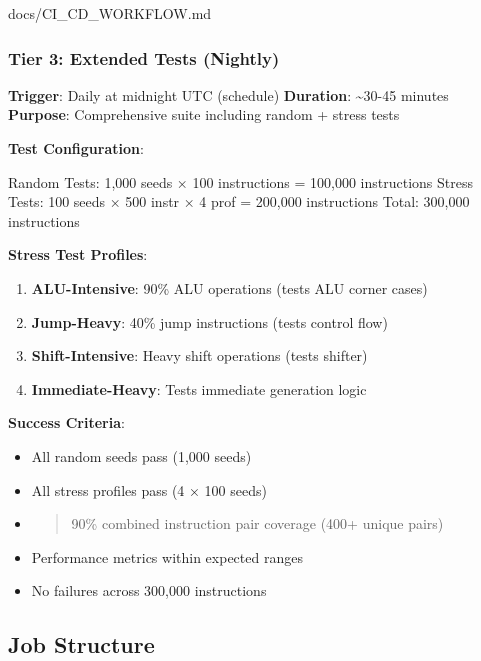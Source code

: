 \begin{relocated}{docs/CI_CD_WORKFLOW.md}
\subsubsection{Tier 3: Extended Tests (Nightly)}\label{um:flow:ci-cd-workflow:tier-3-extended-tests-nightly}

\textbf{Trigger}: Daily at midnight UTC (schedule) \textbf{Duration}:
\textasciitilde30-45 minutes \textbf{Purpose}: Comprehensive suite
including random + stress tests

\textbf{Test Configuration}:

\begin{textblock}
Random Tests:  1,000 seeds × 100 instructions = 100,000 instructions
Stress Tests:  100 seeds × 500 instr × 4 prof = 200,000 instructions
Total:                                          300,000 instructions
\end{textblock}

\textbf{Stress Test Profiles}:

\begin{enumerate}
\def\labelenumi{\arabic{enumi}.}
\tightlist
\item
  \textbf{ALU-Intensive}: 90\% ALU operations (tests ALU corner cases)
\item
  \textbf{Jump-Heavy}: 40\% jump instructions (tests control flow)
\item
  \textbf{Shift-Intensive}: Heavy shift operations (tests shifter)
\item
  \textbf{Immediate-Heavy}: Tests immediate generation logic
\end{enumerate}

\textbf{Success Criteria}:

\begin{itemize}
\item
  All random seeds pass (1,000 seeds)
\item
  All stress profiles pass (4 × 100 seeds)
\item
  \begin{quote}
  90\% combined instruction pair coverage (400+ unique pairs)
  \end{quote}
\item
  Performance metrics within expected ranges
\item
  No failures across 300,000 instructions
\end{itemize}

\subsection{Job Structure}\label{um:flow:ci-cd-workflow:job-structure}


\end{relocated}
